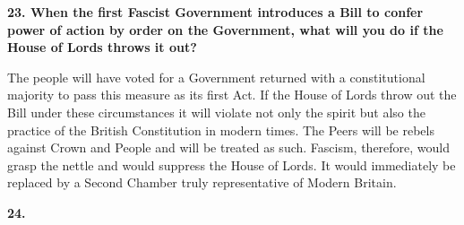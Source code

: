 \documentclass{book}
\begin{document}
\begin{flushright}
\textbf{23. When the first Fascist Government introduces a Bill to confer power of action by order
    on the Government, what will you do if the House of Lords throws it out?}

The people will have voted for a Government returned with a constitutional majority to pass this
measure as its first Act. If the House of Lords throw out the Bill under these circumstances it will
violate not only the spirit but also the practice of the British Constitution in modern times. The
Peers will be rebels against Crown and People and will be treated as such. Fascism, therefore,
would grasp the nettle and would suppress the House of Lords. It would immediately be replaced
by a Second Chamber truly representative of Modern Britain.
\end{flushright}

\begin{flushleft}
\textbf{24. }
\end{flushleft}
\end{document}

